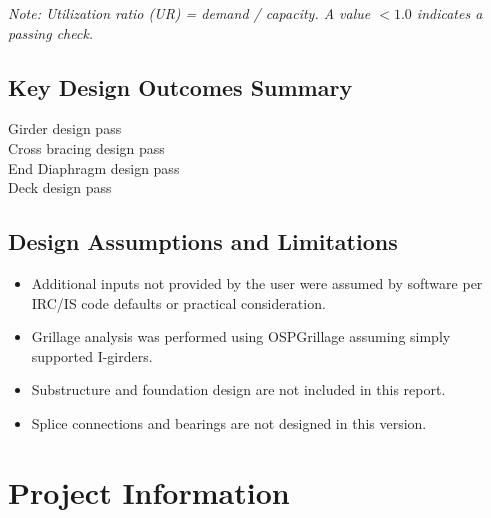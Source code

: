 \documentclass[12pt,a4paper]{report}
\numberwithin{table}{chapter}
\numberwithin{figure}{chapter}
\begin{document}
\vspace{0.4em}
\noindent\textit{Note: Utilization ratio (UR) = demand / capacity. A value $< 1.0$ indicates a passing check.}

\vspace{1em}

\section*{Key Design Outcomes Summary}
\label{sec:key-outcomes}

\noindent Girder design pass \\
Cross bracing design pass \\
End Diaphragm design pass \\
Deck design pass

\section*{Design Assumptions and Limitations}
\label{sec:assumptions}

\begin{itemize}
\item Additional inputs not provided by the user were assumed by software per IRC/IS code defaults or practical consideration.
\item Grillage analysis was performed using OSPGrillage assuming simply supported I-girders.
\item Substructure and foundation design are not included in this report.
\item Splice connections and bearings are not designed in this version.
\end{itemize}

\titleformat{\chapter}[block]{\normalfont\Large\bfseries\centering}{\thechapter}{1em}{}
\titlespacing*{\chapter}{0pt}{-30pt}{10pt}


\chapter{Project Information}
\end{document}
